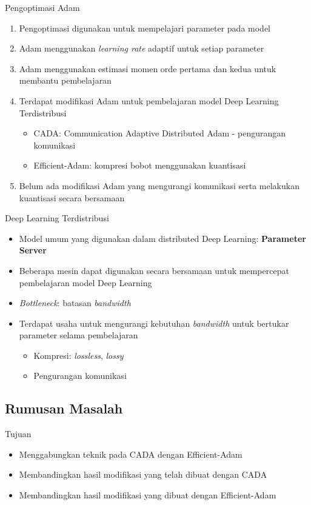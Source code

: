 \documentclass[aspectratio=169]{beamer}
\begin{document}
\begin{frame}{Pengoptimasi Adam}
  \begin{enumerate}
    \item Pengoptimasi digunakan untuk mempelajari parameter pada model
    \item Adam \parencite{ADAMKingma} menggunakan \textit{learning rate} adaptif untuk setiap parameter
    \item Adam menggunakan estimasi momen orde pertama dan kedua untuk membantu pembelajaran
    \item Terdapat modifikasi Adam untuk pembelajaran model Deep Learning Terdistribusi
          \begin{itemize}
            \item CADA: Communication Adaptive Distributed Adam - pengurangan komunikasi \parencite{Chen2021CADA}
            \item Efficient-Adam: kompresi bobot menggunakan kuantisasi \parencite{Chen2022Efficient}
          \end{itemize}
    \item Belum ada modifikasi Adam yang mengurangi komunikasi serta melakukan kuantisasi secara bersamaan
  \end{enumerate}
\end{frame}

\begin{frame}{Deep Learning Terdistribusi}
  \begin{itemize}
    \item Model umum yang digunakan dalam distributed Deep Learning: \textbf{Parameter Server}
    \item Beberapa mesin dapat digunakan secara bersamaan untuk mempercepat pembelajaran model Deep Learning
    \item \textit{Bottleneck}: batasan \textit{bandwidth}
    \item Terdapat usaha untuk mengurangi kebutuhan \textit{bandwidth} untuk bertukar parameter selama pembelajaran
          \begin{itemize}
            \item Kompresi: \textit{lossless}, \textit{lossy}
            \item Pengurangan komunikasi
          \end{itemize}
  \end{itemize}
\end{frame}

\subsection{Rumusan Masalah}
\begin{frame}{Tujuan}
  \begin{itemize}
    \item Menggabungkan teknik pada CADA dengan Efficient-Adam
    \item Membandingkan hasil modifikasi yang telah dibuat dengan CADA
    \item Membandingkan hasil modifikasi yang dibuat dengan Efficient-Adam
  \end{itemize}
\end{frame}
\end{document}
